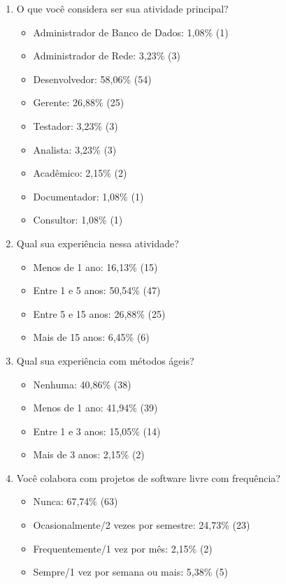 \begin{enumerate}
\item O que você considera ser sua atividade principal?
  \begin{itemize}
  \item Administrador de Banco de Dados: 1,08\% (1)
  \item Administrador de Rede: 3,23\% (3)
  \item Desenvolvedor: 58,06\% (54)
  \item Gerente: 26,88\% (25)
  \item Testador: 3,23\% (3)
  \item Analista: 3,23\% (3)
  \item Acadêmico: 2,15\% (2)
  \item Documentador: 1,08\% (1)
  \item Consultor: 1,08\% (1)
  \end{itemize}

\item Qual sua experiência nessa atividade?
  \begin{itemize}
  \item Menos de 1 ano: 16,13\% (15)
  \item Entre 1 e 5 anos: 50,54\% (47)
  \item Entre 5 e 15 anos: 26,88\% (25)
  \item Mais de 15 anos: 6,45\% (6)
  \end{itemize}

\item Qual sua experiência com métodos ágeis?
  \begin{itemize}
  \item Nenhuma: 40,86\% (38)
  \item Menos de 1 ano: 41,94\% (39)
  \item Entre 1 e 3 anos: 15,05\% (14)
  \item Mais de 3 anos: 2,15\% (2)
  \end{itemize}

\item Você colabora com projetos de software livre com frequência?
  \begin{itemize}
  \item Nunca: 67,74\% (63)
  \item Ocasionalmente/2 vezes por semestre: 24,73\% (23)
  \item Frequentemente/1 vez por mês: 2,15\% (2)
  \item Sempre/1 vez por semana ou mais: 5,38\% (5)
  \end{itemize}


\end{enumerate}
